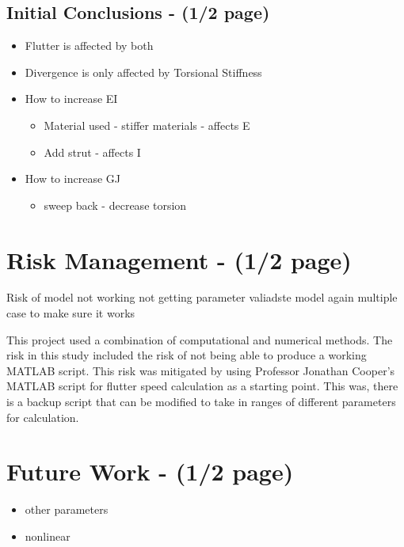 \documentclass[11pt]{article}
\begin{document}
\subsection{Initial Conclusions - (1/2 page)}
\begin{itemize}
    \item Flutter is affected by both
    \item Divergence is only affected by Torsional Stiffness
    \item How to increase EI
    \begin{itemize}
        \item Material used - stiffer materials - affects E
        \item Add strut - affects I
    \end{itemize}
    \item How to increase GJ
    \begin{itemize}
        \item sweep back - decrease torsion
    \end{itemize}
\end{itemize}

\section{Risk Management - (1/2 page)}
Risk of model not working
not getting parameter
valiadste model again multiple case to make sure it works

This project used a combination of computational and numerical methods. The risk in this study included the risk of not being able to produce a working MATLAB script. This risk was mitigated by using Professor Jonathan Cooper's MATLAB script \cite{Wright2015INTRODUCTIONLOADS} for flutter speed calculation as a starting point. This was, there is a backup script that can be modified to take in ranges of different parameters for calculation. 

\section{Future Work - (1/2 page)}
\begin{itemize}
    \item other parameters
    \item nonlinear
\end{itemize}

\end{document}
